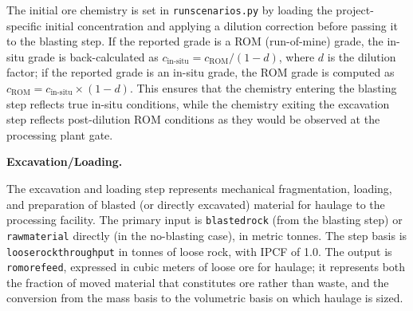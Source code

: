 \documentclass{article}
\renewcommand\_{\textunderscore\allowbreak}
\begin{document}
The initial ore chemistry is set in \texttt{run\_scenarios.py} by loading the project-specific initial concentration and applying a dilution correction before passing it to the blasting step. If the reported grade is a ROM (run-of-mine) grade, the in-situ grade is back-calculated as $c_{\text{in-situ}} = c_{\text{ROM}} / (1 - d)$, where $d$ is the dilution factor; if the reported grade is an in-situ grade, the ROM grade is computed as $c_{\text{ROM}} = c_{\text{in-situ}} \times (1 - d)$. This ensures that the chemistry entering the blasting step reflects true in-situ conditions, while the chemistry exiting the excavation step reflects post-dilution ROM conditions as they would be observed at the processing plant gate.

\medskip
\noindent\textbf{Excavation/Loading.}\quad

The excavation and loading step represents mechanical fragmentation, loading, and preparation of blasted (or directly excavated) material for haulage to the processing facility. The primary input is \texttt{blasted\_rock} (from the blasting step) or \texttt{raw\_material} directly (in the no-blasting case), in metric tonnes. The step basis is \texttt{loose\_rock\_throughput} in tonnes of loose rock, with IPCF of 1.0. The output is \texttt{rom\_ore\_feed}, expressed in cubic meters of loose ore for haulage; it represents both the fraction of moved material that constitutes ore rather than waste, and the conversion from the mass basis to the volumetric basis on which haulage is sized.
\end{document}
